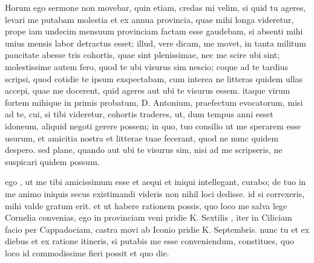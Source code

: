  Horum ego sermone non movebar, quin etiam, credas mi velim, si quid tu ageres, levari me putabam molestia et ex annua provincia, quae mihi longa videretur, prope iam undecim mensuum provinciam factam esse gaudebam, si absenti mihi unius mensis labor detractus esset; illud, vere dicam, me movet, in tanta militum paucitate abesse tris cohortis, quae sint plenissimae, nec me scire ubi sint; molestissime autem fero, quod te ubi visurus sim nescio; coque ad te tardius scripsi, quod cotidie te ipsum exspectabam, cum interea ne litteras quidem ullas accepi, quae me docerent, quid ageres aut ubi te visurus essem. itaque virum fortem mihique in primis probatum, D. Antonium, praefectum evocatorum, misi ad te, cui, si tibi videretur, cohortis traderes, ut, dum tempus anni esset idoneum, aliquid negoti gerere possem; in quo, tuo consilio ut me sperarem esse usurum, et amicitia nostra et litterae tuae fecerant, quod ne nunc quidem despero. sed plane, quando aut ubi te visurus sim, nisi ad me scripseris, ne suspicari quidem possum.

 ego , ut me tibi amicissimum esse et aequi et iniqui intellegant, curabo; de tuo in me animo iniquis secus existimandi videris non nihil loci dedisse. id si correxeris, mihi valde gratum erit. et ut habere rationem possis, quo loco me salva lege Cornelia convenias, ego in provinciam veni pridie K. Sextilis , iter in Ciliciam facio per Cappadociam, castra movi ab Iconio pridie K. Septembris. nunc tu et ex diebus et ex ratione itineris, si putabis me esse conveniendum, constitues, quo loco id commodissime fieri possit et quo die.
